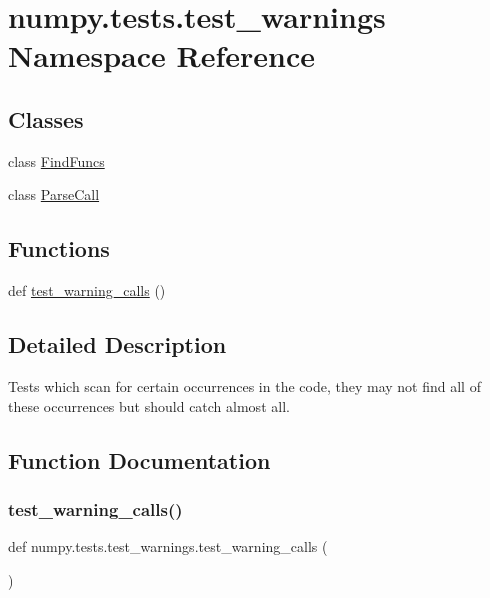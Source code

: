 \hypertarget{namespacenumpy_1_1tests_1_1test__warnings}{}\section{numpy.\+tests.\+test\+\_\+warnings Namespace Reference}
\label{namespacenumpy_1_1tests_1_1test__warnings}
\subsection*{Classes}
\begin{DoxyCompactItemize}
\item 
class \hyperlink{classnumpy_1_1tests_1_1test__warnings_1_1FindFuncs}{Find\+Funcs}
\item 
class \hyperlink{classnumpy_1_1tests_1_1test__warnings_1_1ParseCall}{Parse\+Call}
\end{DoxyCompactItemize}
\subsection*{Functions}
\begin{DoxyCompactItemize}
\item 
def \hyperlink{namespacenumpy_1_1tests_1_1test__warnings_ad9d6dd8d0f7820cf7f9c742f75945c1e}{test\+\_\+warning\+\_\+calls} ()
\end{DoxyCompactItemize}


\subsection{Detailed Description}
\begin{DoxyVerb}Tests which scan for certain occurrences in the code, they may not find
all of these occurrences but should catch almost all.
\end{DoxyVerb}
 

\subsection{Function Documentation}
\mbox{\label{namespacenumpy_1_1tests_1_1test__warnings_ad9d6dd8d0f7820cf7f9c742f75945c1e}} 
\subsubsection{\texorpdfstring{test\+\_\+warning\+\_\+calls()}{test\_warning\_calls()}}
{\footnotesize\ttfamily def numpy.\+tests.\+test\+\_\+warnings.\+test\+\_\+warning\+\_\+calls (\begin{DoxyParamCaption}{ }\end{DoxyParamCaption})}

